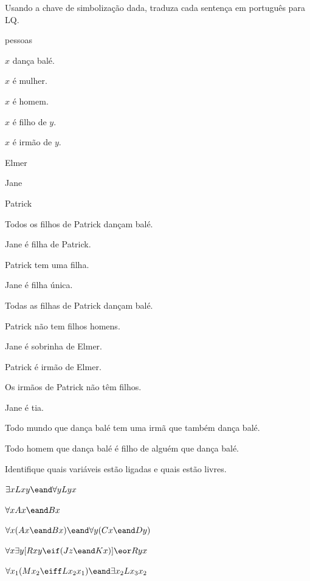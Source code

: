 \solutions
\problempart
\label{pr.QLballet}
Usando a chave de simbolização dada, traduza cada sentença em português para LQ.
\begin{ekey}
\item[UD:] pessoas
\item[Dx:] $x$ dança balé.
\item[Fx:] $x$ é mulher.
\item[Mx:] $x$ é homem.
\item[Cxy:] $x$ é filho de $y$.
\item[Sxy:] $x$ é irmão de $y$.
\item[e:] Elmer
\item[j:] Jane
\item[p:] Patrick
\end{ekey}
\begin{earg}
\item Todos os filhos de Patrick dançam balé.
\item Jane é filha de Patrick.
\item Patrick tem uma filha.
\item Jane é filha única.
\item Todas as filhas de Patrick dançam balé.
\item Patrick não tem filhos homens.
\item Jane é sobrinha de Elmer.
\item Patrick é irmão de Elmer.
\item Os irmãos de Patrick não têm filhos.
\item Jane é tia.
\item Todo mundo que dança balé tem uma irmã que também dança balé.
\item Todo homem que dança balé é filho de alguém que dança balé.
\end{earg}

\problempart
\label{pr.freeQL}
Identifique quais variáveis estão ligadas e quais estão livres.
\begin{earg}
\item $\exists x Lxy \eand \forall y Lyx$
\item $\forall x Ax \eand Bx$
\item $\forall x (Ax \eand Bx) \eand \forall y(Cx \eand Dy)$
\item $\forall x\exists y[Rxy \eif (Jz \eand Kx)] \eor Ryx$
\item $\forall x_1(Mx_2 \eiff Lx_2x_1) \eand \exists x_2 Lx_3x_2$
\end{earg}


